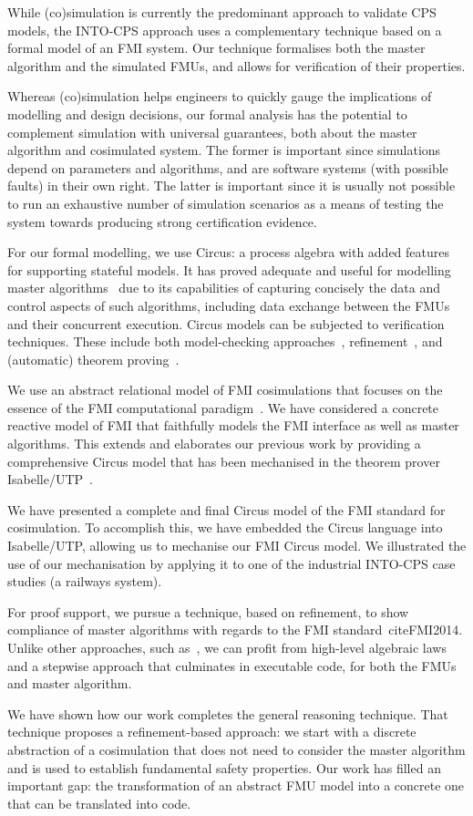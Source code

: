While (co)simulation is currently the predominant approach to validate CPS models, the INTO-CPS approach uses a complementary technique based on a formal model of an FMI system. Our technique formalises both the master algorithm and the simulated FMUs, and allows for verification of their properties.

Whereas (co)simulation helps engineers to quickly gauge the implications of modelling and design decisions, our formal analysis has the potential to complement simulation with universal guarantees, both about the master algorithm and cosimulated system. The former is important since simulations depend on parameters and algorithms, and are software systems (with possible faults) in their own right. The latter is important since it is usually not possible to run an exhaustive number of simulation scenarios as a means of testing the system towards producing strong certification evidence.

For our formal modelling, we use Circus: a process algebra with added features for supporting stateful models. It has proved adequate and useful for modelling master algorithms~\cite{CavalcantiWA16} due to its capabilities of capturing concisely the data and control aspects of such algorithms, including data exchange between the FMUs and their concurrent execution. Circus models can be subjected to verification techniques. These include both model-checking approaches~\cite{GrumbergV2008}, refinement~\cite{CavalcantiSW2003}, and (automatic) theorem proving~\cite{OliveiraCW2009}.

We use an abstract relational model of FMI cosimulations that focuses on the essence of the FMI computational paradigm~\cite{ZCWO17}. We have considered a concrete reactive model of FMI that faithfully models the FMI interface as well as master algorithms. This extends and elaborates our previous work by providing a comprehensive Circus model that has been mechanised in the theorem prover Isabelle/UTP~\cite{FosterZW2016}.

We have presented a complete and final Circus model of the FMI standard for cosimulation. To accomplish this, we have embedded the Circus language into Isabelle/UTP, allowing us to mechanise our FMI Circus model.  We illustrated the use of our mechanisation by applying it to one of the industrial INTO-CPS case studies (a railways system).

For proof support, we pursue a technique, based on refinement, to show compliance of master algorithms with regards to the FMI standard~cite{FMI2014}. Unlike other approaches, such as~\cite{Broman2013}, we can profit from high-level algebraic laws and a stepwise approach that culminates in executable code, for both the FMUs and master algorithm.

We have shown how our work completes the general reasoning technique. That technique proposes a refinement-based approach: we start with a discrete abstraction of a cosimulation that does not need to consider the master algorithm and is used to establish fundamental safety properties. Our work has filled an important gap: the transformation of an abstract FMU model into a concrete one that can be translated into code.